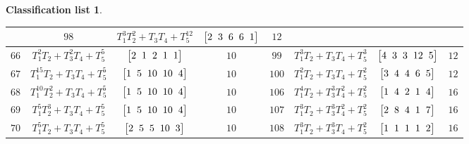 \documentclass[10pt,a4paper]{amsart}
\theoremstyle{definition}
\newtheorem{class-list}[thm]{Classification list}
\numberwithin{equation}{section}
\begin{document}
\begin{class-list}
\begin{table}[t!]
\begin{tabu}{c|c|c|c||c|c|c|c}
&${98}$&${T_{1}^{3}T_{2}^{2}+T_{3}T_{4}+T_{5}^{12}}$
&$\arraycolsep=1mm\begin{bmatrix}{2} & {3} & {6} & {6} & {1}\end{bmatrix}$&${12}$
\\
\hline
${66}$&${T_{1}^{2}T_{2}+T_{3}^{2}T_{4}+T_{5}^{5}}$
&$\arraycolsep=1mm\begin{bmatrix}{2} & {1} & {2} & {1} & {1}\end{bmatrix}$&${10}$
&${99}$&${T_{1}^{3}T_{2}+T_{3}T_{4}+T_{5}^{3}}$
&$\arraycolsep=1mm\begin{bmatrix}{4} & {3} & {3} & {12} & {5}\end{bmatrix}$&${12}$
\\
\hline
${67}$&${T_{1}^{15}T_{2}+T_{3}T_{4}+T_{5}^{5}}$
&$\arraycolsep=1mm\begin{bmatrix}{1} & {5} & {10} & {10} & {4}\end{bmatrix}$&${10}$
&${100}$&${T_{1}^{2}T_{2}+T_{3}T_{4}+T_{5}^{2}}$
&$\arraycolsep=1mm\begin{bmatrix}{3} & {4} & {4} & {6} & {5}\end{bmatrix}$&${12}$
\\
\hline
${68}$&${T_{1}^{10}T_{2}^{2}+T_{3}T_{4}+T_{5}^{5}}$
&$\arraycolsep=1mm\begin{bmatrix}{1} & {5} & {10} & {10} & {4}\end{bmatrix}$&${10}$
&${106}$&${T_{1}^{4}T_{2}+T_{3}^{3}T_{4}^{2}+T_{5}^{2}}$
&$\arraycolsep=1mm\begin{bmatrix}{1} & {4} & {2} & {1} & {4}\end{bmatrix}$&${16}$
\\
\hline
${69}$&${T_{1}^{5}T_{2}^{3}+T_{3}T_{4}+T_{5}^{5}}$
&$\arraycolsep=1mm\begin{bmatrix}{1} & {5} & {10} & {10} & {4}\end{bmatrix}$&${10}$
&${107}$&${T_{1}^{3}T_{2}+T_{3}^{3}T_{4}^{2}+T_{5}^{2}}$
&$\arraycolsep=1mm\begin{bmatrix}{2} & {8} & {4} & {1} & {7}\end{bmatrix}$&${16}$
\\
\hline
${70}$&${T_{1}^{5}T_{2}+T_{3}T_{4}+T_{5}^{5}}$
&$\arraycolsep=1mm\begin{bmatrix}{2} & {5} & {5} & {10} & {3}\end{bmatrix}$&${10}$
&${108}$&${T_{1}^{3}T_{2}+T_{3}^{3}T_{4}+T_{5}^{2}}$
&$\arraycolsep=1mm\begin{bmatrix}{1} & {1} & {1} & {1} & {2}\end{bmatrix}$&${16}$

\end{tabu}
\end{table}
\end{class-list}
\end{document}

